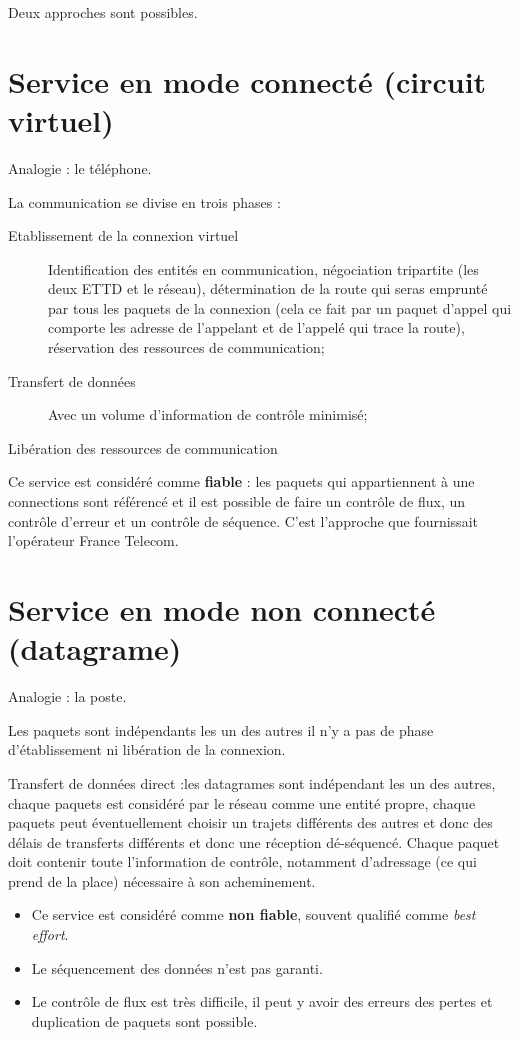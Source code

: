 \documentclass[11pt,english,french]{scrreprt}
\theoremstyle{remark}
\theoremstyle{definition}
\begin{document}
Deux approches sont possibles.

\section{Service en mode connecté (circuit virtuel)} %
Analogie : le téléphone.

La communication se divise en trois phases :\begin{description}
	\item [Etablissement de la connexion virtuel] Identification des entités en communication, négociation tripartite (les deux ETTD et le réseau), détermination de la route qui seras emprunté par tous les paquets de la connexion (cela ce fait par un paquet d'appel qui comporte les adresse de l'appelant et de l'appelé qui trace la route), réservation des ressources de communication;
	\item [Transfert de données] Avec un volume d'information de contrôle minimisé;
	\item [Libération des ressources de communication]
\end{description}

Ce service est considéré comme \textbf{fiable} : les paquets qui appartiennent à une connections sont référencé et il est possible de faire un contrôle de flux, un contrôle d'erreur et un contrôle de séquence. C'est l'approche que fournissait l'opérateur France Telecom\texttrademark.

\section{Service en mode non connecté (datagrame)} %
Analogie : la poste.

Les paquets sont indépendants les un des autres il n'y a pas de phase d'établissement ni libération de la connexion. 

Transfert de données direct :les datagrames sont indépendant les un des autres, chaque paquets est considéré par le réseau comme une entité propre, chaque paquets peut éventuellement choisir un trajets différents des autres et donc des délais de transferts différents et donc une réception dé-séquencé. Chaque paquet doit contenir toute l'information de contrôle, notamment d'adressage (ce qui prend de la place) nécessaire à son acheminement.

\begin{itemize}
	\item Ce service est considéré comme \textbf{non fiable}, souvent qualifié comme \emph{best effort}.
	\item Le séquencement des données n'est pas garanti.
	\item Le contrôle de flux est très difficile, il peut y avoir des erreurs des pertes et duplication de paquets sont possible.
\end{itemize}
\end{document}
